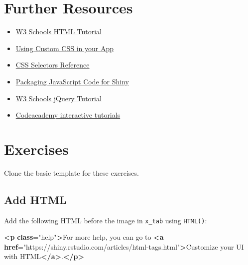 \documentclass[
]{book}
\newenvironment{Shaded}{\begin{snugshade}}{\end{snugshade}}
\newcommand{\ErrorTok}[1]{\textcolor[rgb]{0.64,0.00,0.00}{\textbf{#1}}}
\newcommand{\KeywordTok}[1]{\textcolor[rgb]{0.13,0.29,0.53}{\textbf{#1}}}
\newcommand{\NormalTok}[1]{#1}
\newcommand{\OtherTok}[1]{\textcolor[rgb]{0.56,0.35,0.01}{#1}}
\newcommand{\StringTok}[1]{\textcolor[rgb]{0.31,0.60,0.02}{#1}}
\providecommand{\tightlist}{%
  \setlength{\itemsep}{0pt}\setlength{\parskip}{0pt}}
\begin{document}
\hypertarget{resources-web}{%
\section{Further Resources}\label{resources-web}}

\begin{itemize}
\tightlist
\item
  \href{https://www.w3schools.com/html/}{W3 Schools HTML Tutorial}
\item
  \href{https://shiny.rstudio.com/articles/css.html}{Using Custom CSS in your App}
\item
  \href{https://www.w3schools.com/cssref/css_selectors.asp}{CSS Selectors Reference}
\item
  \href{https://shiny.rstudio.com/articles/packaging-javascript.html}{Packaging JavaScript Code for Shiny}
\item
  \href{https://www.w3schools.com/jquERy/default.asp}{W3 Schools jQuery Tutorial}
\item
  \href{https://www.codecademy.com/en/tracks/htmlcss}{Codeacademy interactive tutorials}
\end{itemize}

\hypertarget{exercises-web}{%
\section{Exercises}\label{exercises-web}}

Clone the basic template for these exercises.

\hypertarget{add-html}{%
\subsection{Add HTML}\label{add-html}}

Add the following HTML before the image in \texttt{x\_tab} using \texttt{HTML()}:

\begin{Shaded}
\begin{Highlighting}[]
\KeywordTok{\textless{}p} \ErrorTok{class}\OtherTok{=}\StringTok{"help"}\KeywordTok{\textgreater{}}\NormalTok{For more help, you can go to }\KeywordTok{\textless{}a} \ErrorTok{href}\OtherTok{=}\StringTok{"https://shiny.rstudio.com/articles/html{-}tags.html"}\KeywordTok{\textgreater{}}\NormalTok{Customize your UI with HTML}\KeywordTok{\textless{}/a\textgreater{}}\NormalTok{.}\KeywordTok{\textless{}/p\textgreater{}}
\end{Highlighting}
\end{Shaded}
\end{document}
